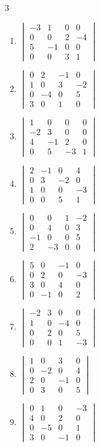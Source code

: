 \begin{multicols}{3}
\begin{enumerate}[label=\arabic*.,  leftmargin=*]
\item $\begin{vmatrix}-3&1&0&0\\0&0&2&-4\\5&-1&0&0\\0&0&3&1\end{vmatrix}$
\item $\begin{vmatrix}0&2&-1&0\\1&0&3&-2\\0&-4&0&5\\3&0&1&0\end{vmatrix}$
\item $\begin{vmatrix}1&0&0&0\\-2&3&0&0\\4&-1&2&0\\0&5&-3&1\end{vmatrix}$
\item $\begin{vmatrix}2&-1&0&4\\0&3&-2&0\\1&0&0&-3\\0&0&5&1\end{vmatrix}$
\item $\begin{vmatrix}0&0&1&-2\\0&4&0&3\\-1&0&0&5\\2&-3&0&0\end{vmatrix}$
\item $\begin{vmatrix}5&0&-1&0\\0&2&0&-3\\3&0&4&0\\0&-1&0&2\end{vmatrix}$
\item $\begin{vmatrix}-2&3&0&0\\1&0&-4&0\\0&2&0&5\\0&0&1&-3\end{vmatrix}$
\item $\begin{vmatrix}1&0&3&0\\0&-2&0&4\\2&0&-1&0\\0&3&0&5\end{vmatrix}$
\item $\begin{vmatrix}0&1&0&-3\\4&0&2&0\\0&-5&0&1\\3&0&-1&0\end{vmatrix}$

\end{enumerate}
\end{multicols}
